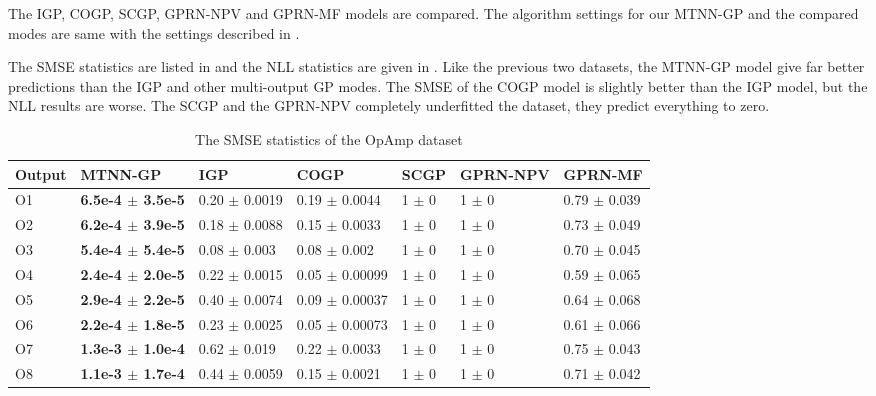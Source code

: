 The IGP, COGP, SCGP, GPRN-NPV and GPRN-MF models are compared. The algorithm settings for our MTNN-GP and the compared modes are same with the settings described in .


The SMSE statistics are listed in  and the NLL statistics are given in . Like the previous two datasets, the MTNN-GP model give far better predictions than the IGP and other multi-output GP modes. The SMSE of the COGP model is slightly better than the IGP model, but the NLL results are worse. The SCGP and the GPRN-NPV completely underfitted the dataset, they predict everything to zero.

\begin{table}[!htb]
    \centering
    \caption{The SMSE statistics of the OpAmp dataset}
    \label{tab:smse_DAC}
    \begin{tabular}{lllllll}
        \toprule
        Output & MTNN-GP               &  IGP                  & COGP                  & SCGP          &  GPRN-NPV    & GPRN-MF            \\ \midrule
        O1     &  \textbf{6.5e-4 $\pm$  3.5e-5} &  0.20 $\pm$  0.0019   &  0.19 $\pm$  0.0044   &  1  $\pm$  0  &  1  $\pm$  0 &  0.79 $\pm$  0.039 \\
        O2     &  \textbf{6.2e-4 $\pm$  3.9e-5} &  0.18 $\pm$  0.0088   &  0.15 $\pm$  0.0033   &  1  $\pm$  0  &  1  $\pm$  0 &  0.73 $\pm$  0.049 \\
        O3     &  \textbf{5.4e-4 $\pm$  5.4e-5} &  0.08 $\pm$  0.003    &  0.08 $\pm$  0.002    &  1  $\pm$  0  &  1  $\pm$  0 &  0.70 $\pm$  0.045 \\
        O4     &  \textbf{2.4e-4 $\pm$  2.0e-5} &  0.22 $\pm$  0.0015   &  0.05 $\pm$  0.00099  &  1  $\pm$  0  &  1  $\pm$  0 &  0.59 $\pm$  0.065 \\
        O5     &  \textbf{2.9e-4 $\pm$  2.2e-5} &  0.40 $\pm$  0.0074   &  0.09 $\pm$  0.00037  &  1  $\pm$  0  &  1  $\pm$  0 &  0.64 $\pm$  0.068 \\
        O6     &  \textbf{2.2e-4 $\pm$  1.8e-5} &  0.23 $\pm$  0.0025   &  0.05 $\pm$  0.00073  &  1  $\pm$  0  &  1  $\pm$  0 &  0.61 $\pm$  0.066 \\
        O7     &  \textbf{1.3e-3 $\pm$  1.0e-4} &  0.62 $\pm$  0.019    &  0.22 $\pm$  0.0033   &  1  $\pm$  0  &  1  $\pm$  0 &  0.75 $\pm$  0.043 \\
        O8     &  \textbf{1.1e-3 $\pm$  1.7e-4} &  0.44 $\pm$  0.0059   &  0.15 $\pm$  0.0021   &  1  $\pm$  0  &  1  $\pm$  0 &  0.71 $\pm$  0.042 \\

\end{tabular}
\end{table}
